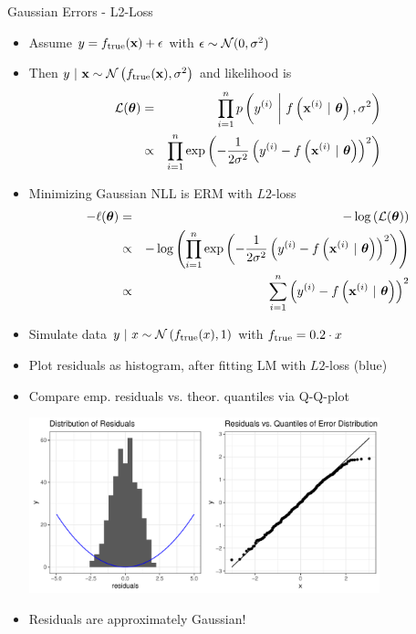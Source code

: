 \documentclass[11pt,compress,t,notes=noshow, xcolor=table]{beamer}
\begin{document}
\begin{vbframe}{Gaussian Errors - L2-Loss} 

\begin{itemize}

\item Assume $y = f_{\text{true}}(\mathbf{x}) + \epsilon$ with $\epsilon \sim \mathcal{N}(0, \sigma^2)$ 
\item Then $y~|~\mathbf{x} \sim \mathcal{N}\left(f_{\text{true}}(\mathbf{x}), \sigma^2\right)$ and likelihood is 
{\small
\begin{eqnarray*}
\mathcal{L}(\bm{\theta}) &=& \prod\limits_{i=1}^n p\left(y^{(i)} ~\bigg|~ f\left(\mathbf{x}^{(i)} ~|~ \bm{\theta}\right), \sigma^2\right) \\ &\propto& \prod\limits_{i=1}^n \exp\left(-\frac{1}{2\sigma^2} \left(y^{(i)} - f\left(\mathbf{x}^{(i)} ~|~ \bm{\theta}\right)\right)^2\right)
\end{eqnarray*}
}


\item Minimizing Gaussian NLL is ERM with $L2$-loss
{\small
\begin{eqnarray*}
- \ell(\bm{\theta}) &=& - \log\left(\mathcal{L}(\bm{\theta})\right) \\
&\propto& - \log\left(\prod\limits_{i=1}^n \exp\left(-\frac{1}{2\sigma^2} \left(y^{(i)} - f\left(\mathbf{x}^{(i)} ~|~ \bm{\theta}\right)\right)^2\right)\right) \\
&\propto& \sum\limits_{i=1}^n \left(y^{(i)} - f\left(\mathbf{x}^{(i)} ~|~ \bm{\theta}\right)\right)^2
\end{eqnarray*}
}

\end{itemize}
\framebreak 

\begin{itemize}
	\item Simulate data $y ~|~x \sim \mathcal{N}\left(f_{\text{true}}(x), 1\right)$ with $f_{\text{true}} = 0.2 \cdot x$ 
\item Plot residuals as histogram, after fitting LM with $L2$-loss (blue)
\item Compare emp. residuals vs. theor. quantiles via Q-Q-plot

\begin{center}
\includegraphics[width = 0.8\textwidth]{figure/residuals_plot_L2.pdf}
\end{center}

\item Residuals are approximately Gaussian!
\end{itemize}

\end{vbframe}
\end{document}
